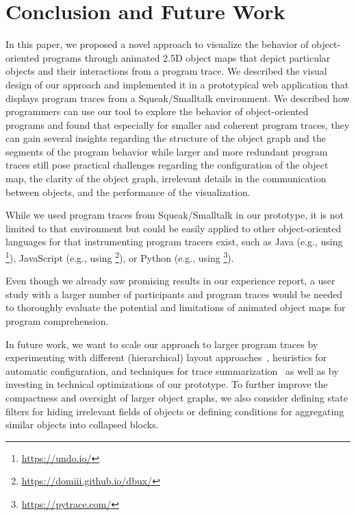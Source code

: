 \section{Conclusion and Future Work}
\label{sec:conclusion}

In this paper, we proposed a novel approach to visualize the behavior of object-oriented programs through animated 2.5D object maps that depict particular objects and their interactions from a program trace.
We described the visual design of our approach and implemented it in a prototypical web application that displays program traces from a Squeak/Smalltalk environment.
We described how programmers can use our tool to explore the behavior of object-oriented programs and found that especially for smaller and coherent program traces, they can gain several insights regarding the structure of the object graph and the segments of the program behavior while larger and more redundant program traces still pose practical challenges regarding the configuration of the object map, the clarity of the object graph, irrelevant details in the communication between objects, and the performance of the visualization.

While we used program traces from Squeak/Smalltalk in our prototype, it is not limited to that environment but could be easily applied to other object-oriented languages for that instrumenting program tracers exist, such as Java (e.g., using \footnote{\url{https://undo.io/}}), JavaScript (e.g., using \footnote{\url{https://domiii.github.io/dbux/}}), or Python (e.g., using \footnote{\url{https://pytrace.com/}}).

Even though we already saw promising results in our experience report, a user study with a larger number of participants and program traces would be needed to thoroughly evaluate the potential and limitations of animated object maps for program comprehension.

In future work, we want to scale our approach to larger program traces by experimenting with different (hierarchical) layout approaches~\cite{kuhn2008consistent,atzberger2023visualization}, heuristics for automatic configuration, and techniques for trace summarization~\cite{hamouLhadj2006summarizing,noda2017identifying} as well as by investing in technical optimizations of our prototype.
To further improve the compactness and oversight of larger object graphs, we also consider defining state filters for hiding irrelevant fields of objects or defining conditions for aggregating similar objects into collapsed blocks.

